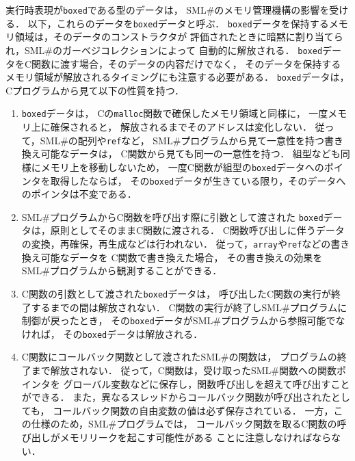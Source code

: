 \documentclass{jbook}
\newcommand{\smlsharp}{SML\#}
\begin{document}
	実行時表現が{\tt boxed}である型のデータは，
\smlsharp{}のメモリ管理機構の影響を受ける．
	以下，これらのデータを{\tt boxed}データと呼ぶ．
	{\tt boxed}データを保持するメモリ領域は，そのデータのコンストラクタが
評価されたときに暗黙に割り当てられ，\smlsharp{}のガーベジコレクションによって
自動的に解放される．
	{\tt boxed}データをC関数に渡す場合，そのデータの内容だけでなく，
そのデータを保持するメモリ領域が解放されるタイミングにも注意する必要がある．
	{\tt boxed}データは，Cプログラムから見て以下の性質を持つ．
\begin{enumerate}
\item
	{\tt boxed}データは，
Cの{\tt malloc}関数で確保したメモリ領域と同様に，
一度メモリ上に確保されると，
解放されるまでそのアドレスは変化しない．
	従って，\smlsharp{}の配列や{\tt ref}など，
\smlsharp{}プログラムから見て一意性を持つ書き換え可能なデータは，
C関数から見ても同一の一意性を持つ．
	組型なども同様にメモリ上を移動しないため，
一度C関数が組型の{\tt boxed}データへのポインタを取得したならば，
その{\tt boxed}データが生きている限り，そのデータへのポインタは不変である．
\item
	\smlsharp{}プログラムからC関数を呼び出す際に引数として渡された
{\tt boxed}データは，原則としてそのままC関数に渡される．
	C関数呼び出しに伴うデータの変換，再確保，再生成などは行われない．
	従って，{\tt array}や{\tt ref}などの書き換え可能なデータを
C関数で書き換えた場合，
その書き換えの効果を\smlsharp{}プログラムから観測することができる．
\item
	C関数の引数として渡された{\tt boxed}データは，
呼び出したC関数の実行が終了するまでの間は解放されない．
	C関数の実行が終了し\smlsharp{}プログラムに制御が戻ったとき，
その{\tt boxed}データが\smlsharp{}プログラムから参照可能でなければ，
その{\tt boxed}データは解放される．
\item
	C関数にコールバック関数として渡された\smlsharp{}の関数は，
プログラムの終了まで解放されない．
	従って，C関数は，受け取った\smlsharp{}関数への関数ポインタを
グローバル変数などに保存し，関数呼び出しを超えて呼び出すことができる．
	また，異なるスレッドからコールバック関数が呼び出されたとしても，
コールバック関数の自由変数の値は必ず保存されている．
	一方，この仕様のため，\smlsharp{}プログラムでは，
コールバック関数を取るC関数の呼び出しがメモリリークを起こす可能性がある
ことに注意しなければならない．

\end{enumerate}
\end{document}
